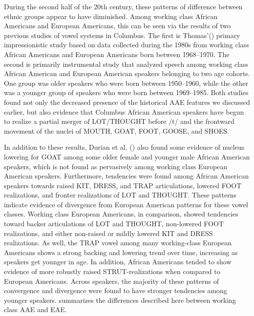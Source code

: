 \documentclass[output=paper,colorlinks,citecolor=brown]{langscibook}
\begin{document}
 During the second half of the 20th century, these patterns of difference between ethnic groups appear to have diminished. Among working class African Americans and European Americans, this can be seen via the results of two previous studies of vowel systems in Columbus. The first is Thomas’(\citeyear{Thomas1989vowel}) primary impressionistic study based on data collected during the 1980s from working class African Americans and European Americans born between 1968--1970. The second is  primarily instrumental study that analyzed speech among working class African American and European American speakers belonging to two age cohorts. One group was older speakers who were born between 1950--1960, while the other was a younger group of speakers who were born between 1969--1985. Both studies found not only the decreased presence of the historical AAE features we discussed earlier, but also evidence that Columbus African American speakers have begun to realize a partial merger of LOT/THOUGHT before /t/ and the frontward movement of the nuclei of MOUTH, GOAT, FOOT, GOOSE, and SHOES.

In addition to these results, Durian et al. (\citeyear{Durianschumacher2010}) also found some evidence of nucleus lowering for GOAT among some older female and younger male African American speakers, which is not found as pervasively among working class European American speakers. Furthermore, tendencies were found among African American speakers towards raised KIT, DRESS, and TRAP articulations, lowered FOOT realizations, and fronter realizations of LOT and THOUGHT. These patterns indicate evidence of divergence from European American patterns for these vowel classes. Working class European Americans, in comparison, showed tendencies toward backer articulations of LOT and THOUGHT, non-lowered FOOT realizations, and either non-raised or mildly lowered KIT and DRESS realizations. As well, the TRAP vowel among many working-class European Americans shows a strong backing and lowering trend over time, increasing as speakers get younger in age. In addition, African Americans tended to show evidence of more robustly raised STRUT-realizations when compared to European Americans. Across speakers, the majority of these patterns of convergence and divergence were found to have stronger tendencies among younger speakers.  summarizes the differences described here between working class AAE and EAE.
\end{document}
